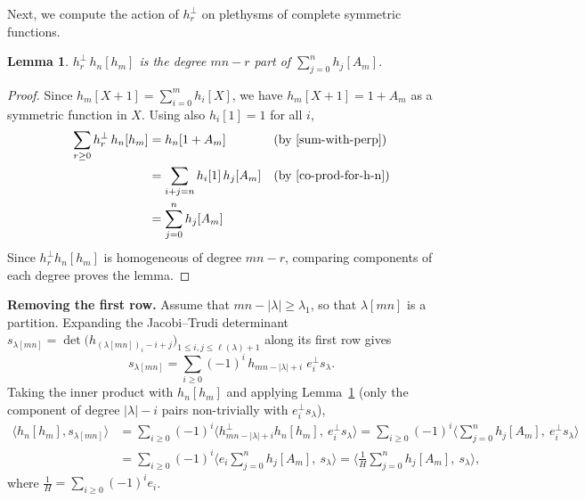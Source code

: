 \documentclass[reqno]{amsart}
\theoremstyle{plain}
\newtheorem{lemma}[theorem]{Lemma}
\theoremstyle{definition}
\theoremstyle{remark}
\theoremstyle{plain}
\begin{document}
Next, we compute the action of $h_r^\perp$ on plethysms of complete symmetric
functions.

\begin{lemma}\label{lem:hperp}
$h_r^\perp\, h_n[h_m]$ is the degree $mn-r$ part of $\sum_{j=0}^{n}h_j[A_m]$.
\end{lemma}
\begin{proof}
Since $h_m[X+1]=\sum_{i=0}^m h_i[X]$, we have $h_m[X+1]=1+A_m$ as a symmetric
function in $X$. Using also $h_i[1]=1$ for all $i$,
\begin{align*}
\sum_{r\ge0} h_r^\perp\, h_n[h_m]&=h_n[1+A_m] &&\text{(by \eqref{sum-with-perp})}\\
&=\sum_{i+j=n}h_i[1]\,h_j[A_m] &&\text{(by \eqref{co-prod-for-h-n})}\\
&=\sum_{j=0}^nh_j[A_m]
\end{align*}
Since $h_r^\perp h_n[h_m]$ is homogeneous of degree $mn-r$, comparing
components of each degree proves the lemma.
\end{proof}

\medskip
\noindent\textbf{Removing the first row.} Assume that
$mn-|\lambda|\ge \lambda_1$, so that $\lambda[mn]$ is a partition. Expanding
the Jacobi--Trudi determinant
$s_{\lambda[mn]}=\det\big(h_{(\lambda[mn])_i-i+j}\big)_{1\leq i,j\leq \ell(\lambda)+1}$
along its first row gives
$$s_{\lambda[mn]}=\sum_{i\ge0}(-1)^i\, h_{mn-|\lambda|+i}\; e_i^\perp s_\lambda .$$
Taking the inner product with $h_n[h_m]$ and applying Lemma~\ref{lem:hperp}
(only the component of degree $|\lambda|-i$ pairs non-trivially with
$e_i^\perp s_\lambda$),
\begin{align*}\langle h_n[h_m],s_{\lambda[mn]}\rangle
&=\sum_{i\ge0}(-1)^i\Big\langle h_{mn-|\lambda|+i}^\perp h_n[h_m],\ e_i^\perp s_\lambda\Big\rangle
=\sum_{i\ge0}(-1)^i\Big\langle \sum_{j=0}^{n}h_j[A_m],\ e_i^\perp s_\lambda\Big\rangle\\
&=\sum_{i\ge0}(-1)^i\Big\langle e_i\sum_{j=0}^{n}h_j[A_m],\ s_\lambda\Big\rangle
=\Big\langle \frac{1}{H}\sum_{j=0}^{n}h_j[A_m],\ s_\lambda\Big\rangle,
\end{align*}
where $\frac{1}{H}=\sum_{i\ge0}(-1)^ie_i$.
\end{document}
